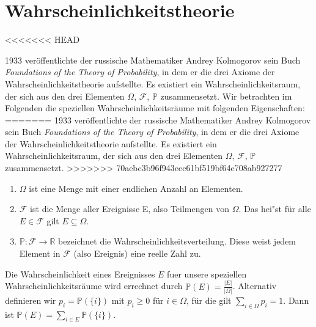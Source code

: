\section{Wahrscheinlichkeitstheorie}
<<<<<<< HEAD


\vspace{15pt}


1933 ver\"offentlichte der russische Mathematiker Andrey Kolmogorov sein Buch \textit{Foundations of the Theory of Probability}, in dem er die drei Axiome der Wahrscheinlichkeitstheorie aufstellte. Es existiert ein Wahrscheinlichkeitsraum, der sich aus den drei Elementen $\Omega$, $\mathcal{F}$, $\mathbb{P}$ zusammensetzt. Wir betrachten im Folgenden die speziellen Wahrscheinlichkeitsr\"aume mit folgenden Eigenschaften:
=======
1933 ver\"offentlichte der russische Mathematiker Andrey Kolmogorov sein Buch \textit{Foundations of the Theory of Probability}, in dem er die drei Axiome der Wahrscheinlichkeitstheorie aufstellte. Es existiert ein Wahrscheinlichkeitsraum, der sich aus den drei Elementen $\Omega$, $\mathcal{F}$, $\mathbb{P}$ zusammensetzt.
>>>>>>> 70aebc3b96f943eec61bf519bf64e708ab927277

\vspace{5pt}

\begin{enumerate}
	\item $\Omega$ ist eine Menge mit einer endlichen Anzahl an Elementen.
	\item $\mathcal{F}$ ist die Menge aller Ereignisse E, also Teilmengen von $\Omega$. Das hei"st f\"ur alle $E \in \mathcal{F}$ gilt $E \subseteq \Omega$.
	\item $\mathbb{P}: \mathcal{F} \rightarrow \mathbb{R}$ bezeichnet die Wahrscheinlichkeitsverteilung. Diese weist jedem Element in $\mathcal{F}$ (also Ereignis) eine reelle Zahl zu.  
	
	
\end{enumerate}

\vspace{10pt}


Die Wahrscheinlichkeit eines Ereignisses $E$ fuer unsere speziellen Wahrscheinlichkeitsr\"aume wird errechnet durch $ \mathbb{P}(E) = \frac{|E|}{|\Omega|}$.
Alternativ definieren wir $p_{i} = \mathbb{P} (\{i\})$ mit $p_{i} \geq 0$  
f\"ur $i \in \Omega$, f\"ur die gilt $\sum_{i\in \Omega} p_{i} =1$. Dann ist $\mathbb{P}(E) = \sum_{i\in E} \mathbb{P}(\{i\})$. 


